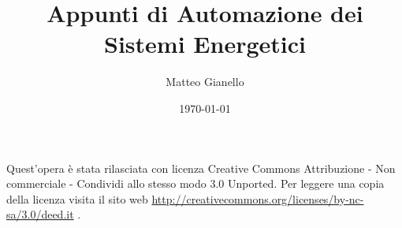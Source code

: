 \documentclass[a4paper,11pt, twoside]{article}
\title{Appunti di Automazione dei Sistemi Energetici}
\author{Matteo Gianello}
\date{\today}
\theoremstyle{definition}
\begin{document}
\pagestyle{empty}
\thispagestyle{empty}
\maketitle
\vspace{5cm}
\begin{center}
Quest'opera è stata rilasciata con licenza Creative Commons Attribuzione - Non commerciale - Condividi allo stesso modo 3.0 Unported. Per leggere una copia della licenza visita il sito web \url{http://creativecommons.org/licenses/by-nc-sa/3.0/deed.it} \ccbyncsa.
\end{center}
\newpage

\thispagestyle{plain}
\tableofcontents
\newpage

\pagestyle{plain}







\end{document}
